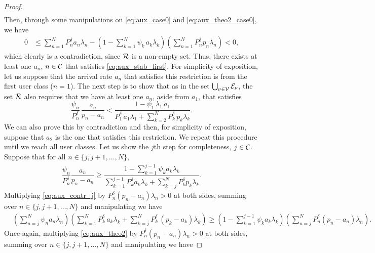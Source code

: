 \begin{proof}
\begin{align}
    \end{align}
    Then, through some manipulations on \eqref{eq:aux_case0} and \eqref{eq:aux_theo2_case0}, we have
    \begin{align*}
        0 &\le \sum_{n=1}^N P_n^\delta a_n \lambda_n - \left(1 - \sum_{k=1}^N \psi_k\,a_k \lambda_k \right)\left(\sum_{n=1}^N P_n^\delta p_n \lambda_n\right) < 0,
    \end{align*}
    which clearly is a contradiction, since $\cal{R}$ is a non-empty set. Thus, there exists at least one $a_n$, $n\in\cal{C}$ that satisfies \eqref{eq:aux_stab_first}.
    For simplicity of exposition, let us suppose that the arrival rate $a_n$ that satisfies this restriction is from the first user class ($n=1$). The next step is to show that as in the set $\bigcup_{\nu\in\cal{V}}\cal{E}_\nu$, the set $\cal{R}$ also requires that we have at least one $a_n$, aside from $a_1$, that satisfies
    \begin{equation*}
    	\dfrac{\psi_n}{P_n^\delta}\,\dfrac{a_n}{p_n-a_n} <
        \dfrac{1-\psi_1\,\lambda_1\,a_1}{P_1^\delta\,a_1\lambda_1+
        \sum_{k=2}^N P_k^\delta\,p_k\lambda_k}.
    \end{equation*}
    We can also prove this by contradiction and then, for simplicity of exposition, suppose that $a_2$ is the one that satisfies this restriction. We repeat this procedure until we reach all user classes. Let us show the $j$th step for completeness, $j\in\cal{C}$. Suppose that for all $n \in \{j,j+1,\dots,N\}$,
    \begin{align} \label{eq:aux_contr_j}
        \dfrac{\psi_n}{P_n^\delta}\dfrac{a_n}{p_n-a_n}
        \ge \dfrac{ 1 - \sum_{k=1}^{j-1} \psi_k a_k \lambda_k }
        {\sum_{k=1}^{j-1} P_k^{\delta} a_k\lambda_k +
        \sum_{k=j}^N P_k^\delta p_k\lambda_k}.
    \end{align}
    Multiplying \eqref{eq:aux_contr_j} by $P_n^\delta(p_n-a_n)\lambda_n > 0$ at both sides, summing over $n\in\{j,j+1,\dots,N\}$ and manipulating we have
    \begin{align} \label{eq:aux_case_j}
        &\left(\sum_{n=j}^N \psi_n a_n \lambda_n \right)\!
            \left(\sum_{k=1}^N P_k^\delta\,a_k \lambda_k + \sum_{k=j}^N P_k^\delta\,(p_k-a_k) \lambda_k \right) \ge \left( 1 - \sum_{k=1}^{j-1} \psi_k a_k \lambda_k \right)\!
            \left( \sum_{n=j}^N P_n^\delta (p_n-a_n) \lambda_n \right).
    \end{align}
    Once again, multiplying \eqref{eq:aux_theo2} by $P_n^\delta(p_n-a_n)\lambda_n > 0$ at both sides, summing over $n\in\{j,j+1,\dots,N\}$ and manipulating we have

\end{proof}
